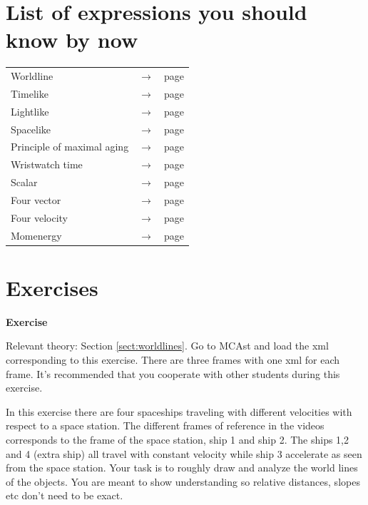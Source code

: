 {\begin{multicols}{2}
\section{List of expressions you should know by now}
\begin{tabular}{l c l}
Worldline			& $\rightarrow$ & page \pageref{pg:worldline}\\
Timelike			& $\rightarrow$ & page \pageref{pg:timelike}\\
Lightlike			& $\rightarrow$ & page \pageref{pg:lightlike}\\
Spacelike			& $\rightarrow$ & page \pageref{pg:spacelike}\\
Principle of maximal aging  	& $\rightarrow$ & page \pageref{pg:maximalaging}\\
Wristwatch time			& $\rightarrow$ & page \pageref{pg:wristwatchtime}\\
Scalar				& $\rightarrow$ & page \pageref{pg:scalar}\\
Four vector			& $\rightarrow$ & page \pageref{pg:fourvector}\\
Four velocity			& $\rightarrow$ & page \pageref{pg:fourvelocity}\\
Momenergy  			& $\rightarrow$ & page \pageref{pg:momenergy}\\
\end{tabular}

\newpage



\pagestyle{headings}
\section{Exercises}
\newcommand{\newproblem}[1]{\label{#1}{\bf Exercise \refproblem{#1}}}

\newproblem{prob:xtdiagram}

Relevant theory: Section \ref{sect:worldlines}.\newline 
Go to MCAst and load the xml corresponding to this exercise. There are three frames with one xml for each frame. It's recommended that you cooperate with other students during this exercise.

In this exercise there are four spaceships traveling with different velocities with respect to a space station. The different frames of reference in the videos corresponds to the frame of the space station, ship 1 and ship 2. The ships 1,2 and 4 (extra ship) all travel with constant velocity while ship 3 accelerate as seen from the space station. Your task is to roughly draw and analyze the world lines of the objects. You are meant to show understanding so relative distances, slopes etc don't need to be exact.


\end{multicols}}

